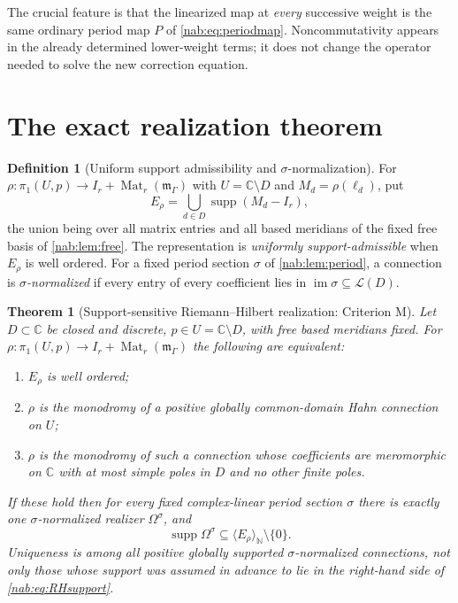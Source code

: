 \documentclass[11pt,letterpaper]{article}
\newtheorem{theorem}{Theorem}[section]
\theoremstyle{definition}
\newtheorem{definition}[definition]{Definition}
\theoremstyle{remark}
\newcommand{\C}{\mathbb C}
\newcommand{\N}{\mathbb N}
\newcommand{\mm}{\mathfrak m_\Gamma}
\newcommand{\LL}{\mathcal L}
\newcommand{\Mat}{\operatorname{Mat}}
\newcommand{\supp}{\operatorname{supp}}
\newcommand{\im}{\operatorname{im}}
\newcommand{\angles}[1]{\langle #1\rangle_{\N}}
\numberwithin{equation}{section}
\begin{document}
The crucial feature is that the linearized map at \emph{every} successive
weight is the same ordinary period map $P$ of \eqref{nab:eq:periodmap}.
Noncommutativity appears in the already determined lower-weight terms; it does
not change the operator needed to solve the new correction equation.

\section{The exact realization theorem}\label{nab:sec:rh}

\begin{definition}[Uniform support admissibility and $\sigma$-normalization]
\label{nab:def:admissible}
For $\rho:\pi_1(U,p)\to I_r+\Mat_r(\mm)$ with $U=\C\setminus D$ and
$M_d=\rho(\ell_d)$, put
\begin{equation}\label{nab:eq:Erho}
 E_\rho=\bigcup_{d\in D}\supp(M_d-I_r),
\end{equation}
the union being over all matrix entries and all based meridians of the fixed
free basis of \cref{nab:lem:free}. The representation is \emph{uniformly
support-admissible} when $E_\rho$ is well ordered. For a fixed period section
$\sigma$ of \cref{nab:lem:period}, a connection is
\emph{$\sigma$-normalized} if every entry of every coefficient lies in
$\im\sigma\subseteq\LL(D)$.
\end{definition}

\begin{theorem}[Support-sensitive Riemann--Hilbert realization: Criterion M]
\label{nab:thm:RH}
Let $D\subset\C$ be closed and discrete, $p\in U=\C\setminus D$, with free
based meridians fixed. For $\rho:\pi_1(U,p)\to I_r+\Mat_r(\mm)$ the following
are equivalent:
\begin{enumerate}[label=\textup{(\roman*)}]
\item $E_\rho$ is well ordered;
\item $\rho$ is the monodromy of a positive globally common-domain Hahn
connection on $U$;
\item $\rho$ is the monodromy of such a connection whose coefficients are
meromorphic on $\C$ with at most simple poles in $D$ and no other finite
poles.
\end{enumerate}
If these hold then for every fixed complex-linear period section $\sigma$
there is exactly one $\sigma$-normalized realizer $\Omega^\sigma$, and
\begin{equation}\label{nab:eq:RHsupport}
 \supp\Omega^\sigma\subseteq\angles{E_\rho}\setminus\{0\}.
\end{equation}
Uniqueness is among \emph{all} positive globally supported
$\sigma$-normalized connections, not only those whose support was assumed in
advance to lie in the right-hand side of \eqref{nab:eq:RHsupport}.
\end{theorem}
\end{document}
